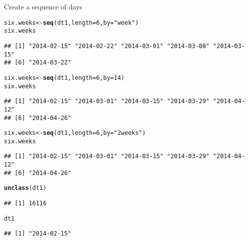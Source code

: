 \documentclass[12pt, a4paper, oneside]{article}\usepackage[]{graphicx}\usepackage[]{color}
\makeatletter
\newcommand{\hlstr}[1]{\textcolor[rgb]{0.192,0.494,0.8}{#1}}%
\newcommand{\hlkwd}[1]{\textcolor[rgb]{0.737,0.353,0.396}{\textbf{#1}}}%
\newenvironment{kframe}{%
 \def\at@end@of@kframe{}%
 \ifinner\ifhmode%
  \def\at@end@of@kframe{\end{minipage}}%
  \begin{minipage}{\columnwidth}%
 \fi\fi%
 \def\FrameCommand##1{\hskip\@totalleftmargin \hskip-\fboxsep
 \colorbox{shadecolor}{##1}\hskip-\fboxsep
     \hskip-\linewidth \hskip-\@totalleftmargin \hskip\columnwidth}%
 \MakeFramed {\advance\hsize-\width
   \@totalleftmargin\z@ \linewidth\hsize
   \@setminipage}}%
 {\par\unskip\endMakeFramed%
 \at@end@of@kframe}
\newenvironment{knitrout}{}{} %
\makeatother
\begin{document}
Create a sequence of days
\begin{knitrout}
\color{fgcolor}\begin{kframe}
\begin{alltt}
six.weeks <- \hlkwd{seq}(dt1, length = 6, by = \hlstr{"week"})
six.weeks
\end{alltt}
\begin{verbatim}
## [1] "2014-02-15" "2014-02-22" "2014-03-01" "2014-03-08" "2014-03-15"
## [6] "2014-03-22"
\end{verbatim}
\begin{alltt}
six.weeks <- \hlkwd{seq}(dt1, length = 6, by = 14)
six.weeks
\end{alltt}
\begin{verbatim}
## [1] "2014-02-15" "2014-03-01" "2014-03-15" "2014-03-29" "2014-04-12"
## [6] "2014-04-26"
\end{verbatim}
\begin{alltt}
six.weeks <- \hlkwd{seq}(dt1, length = 6, by = \hlstr{"2 weeks"})
six.weeks
\end{alltt}
\begin{verbatim}
## [1] "2014-02-15" "2014-03-01" "2014-03-15" "2014-03-29" "2014-04-12"
## [6] "2014-04-26"
\end{verbatim}
\end{kframe}
\end{knitrout}

\begin{knitrout}
\color{fgcolor}\begin{kframe}
\begin{alltt}
\hlkwd{unclass}(dt1)
\end{alltt}
\begin{verbatim}
## [1] 16116
\end{verbatim}
\begin{alltt}
dt1
\end{alltt}
\begin{verbatim}
## [1] "2014-02-15"
\end{verbatim}
\end{kframe}
\end{knitrout}
\end{document}
